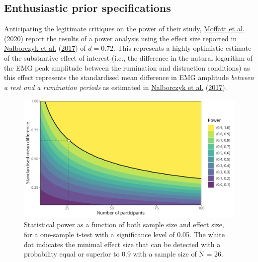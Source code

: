 \documentclass[
  english,
  man, donotrepeattitle,floatsintext]{apa6}
\begin{document}
\hypertarget{enthusiastic-prior-specifications}{%
\subsection{Enthusiastic prior specifications}\label{enthusiastic-prior-specifications}}

Anticipating the legitimate critiques on the power of their study, \protect\hyperlink{ref-moffatt_inner_2020}{Moffatt et al.} (\protect\hyperlink{ref-moffatt_inner_2020}{2020}) report the results of a power analysis using the effect size reported in \protect\hyperlink{ref-nalborczyk_orofacial_2017}{Nalborczyk et al.} (\protect\hyperlink{ref-nalborczyk_orofacial_2017}{2017}) of \(d = 0.72\). This represents a highly optimistic estimate of the substantive effect of interest (i.e., the difference in the natural logarithm of the EMG peak amplitude between the rumination and distraction conditions) as this effect represents the standardised mean difference in EMG amplitude \emph{between a rest and a rumination periods} as estimated in \protect\hyperlink{ref-nalborczyk_orofacial_2017}{Nalborczyk et al.} (\protect\hyperlink{ref-nalborczyk_orofacial_2017}{2017}).

\begin{figure}[!htb]

{\centering \includegraphics[width=1\linewidth]{manuscript_files/figure-latex/power-1} 

}

\caption{Statistical power as a function of both sample size and effect size, for a one-sample t-test with a significance level of 0.05. The white dot indicates the minimal effect size that can be detected with a probability equal or superior to 0.9 with a sample size of N = 26.}\label{fig:power}
\end{figure}
\end{document}
